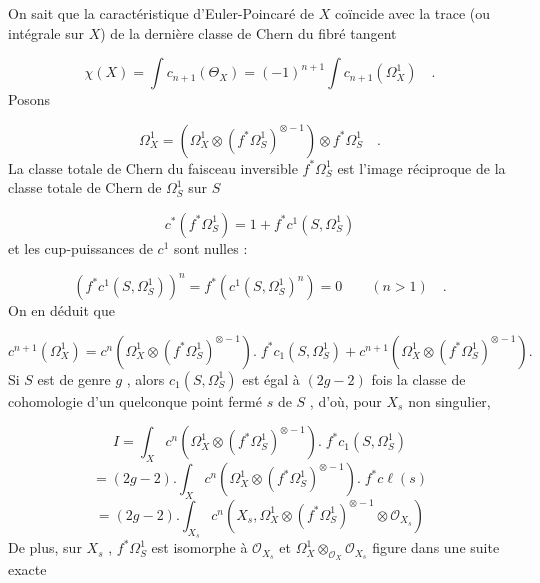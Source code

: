 On sait que la caractéristique d'Euler-Poincaré de $X$ coïncide avec la trace (ou intégrale sur $X$) de la dernière classe de Chern du fibré tangent

\begin{equation*}
\chi(X)=\int c_{n+1}(\Theta_X)=(-1)^{n+1}\int c_{n+1}(\Omega_X^1) \quad .
\end{equation*}
Posons

\begin{equation*}
\Omega_X^1=\left(\Omega_X^1\otimes(f^*\Omega_S^1)^{\otimes-1}\right)\otimes f^*\Omega_S^1 \quad .
\end{equation*}
La classe totale de Chern du faisceau inversible $f^*\Omega_S^1$ est l'image réciproque de la classe totale de Chern de $\Omega_S^1$ sur $S$



\begin{equation*}
 c^{*}(f^{*} \Omega^{1}_{S}) = 1 + f^{*}c^{1}(S,\Omega^{1}_{S})
\end{equation*}
et les cup-puissances de $c^{1}$ sont nulles :

\begin{equation*}
(f^{*} c^{1}(S,\Omega^{1}_{S}))^{n} = f^{*}(c^{1}(S,\Omega^{1}_{S})^{n}) = 0 \qquad (n > 1) \quad .
\end{equation*}
On en déduit que

\begin{equation*}
c^{n+1}(\Omega^{1}_{X}) = c^{n}(\Omega^{1}_{X} \otimes (f^{*}\Omega^{1}_{S})^{\otimes -1}) . \; f^{*}c_{1}(S,\Omega^{1}_{S}) + c^{n+1}(\Omega^{1}_{X} \otimes (f^{*} \Omega^{1}_{S})^{\otimes -1}) .
\end{equation*}
Si $S$ est de genre $g$ , alors $c_{1}(S,\Omega^{1}_{S})$ est égal à $(2g - 2)$ fois la classe de cohomologie d'un quelconque point fermé $s$ de $S$ , d'où, pour $X_{s}$ non singulier,

\begin{equation*}
I = \int_{X} c^{n}(\Omega^{1}_{X} \otimes (f^{*} \Omega^{1}_{S})^{\otimes -1}) . \; f^{*}c_{1}(S,\Omega^{1}_{S})
\end{equation*}
\begin{equation*}
= (2g-2) . \int_{X} c^{n}(\Omega^{1}_{X} \otimes (f^{*} \Omega^{1}_{S})^{\otimes -1}) . \; f^{*}c\ell(s)
\end{equation*}
\begin{equation*}
= (2g-2) . \int_{X_{s}} c^{n}(X_{s},\Omega^{1}_{X} \otimes (f^{*} \Omega^{1}_{S})^{\otimes -1} \otimes \mathcal{O}_{X_{s}})
\end{equation*}
De plus, sur $X_{s}$ , $f^{*}\Omega^{1}_{S}$ est isomorphe à $\mathcal{O}_{X_{s}}$ et $\Omega^{1}_{X} \otimes_{\mathcal{O}_{X}} \mathcal{O}_{X_{s}}$ figure dans une suite exacte


